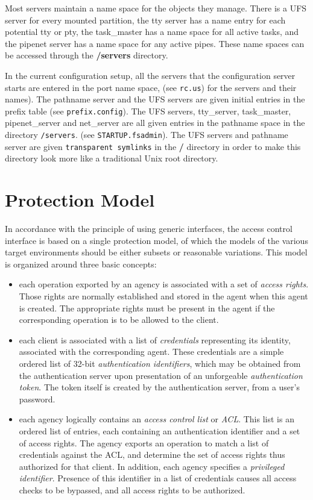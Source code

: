 Most servers maintain a name space for the objects they manage. There is
a UFS server for every mounted partition, the tty server has a name entry
for each potential tty or pty, the task\_master has a name space for all
active tasks, and the pipenet server has a name space for any active pipes.
These name spaces can be accessed through the {\bf /servers} directory.

In the current configuration setup, all the servers that the configuration server
starts are entered in the port name space, (see \verb|rc.us|) for the servers and their
names). The pathname server and the UFS servers
are given initial entries in the prefix table (see \verb|prefix.config|).
The UFS
servers, tty\_server, task\_master, pipenet\_server and net\_server are all
given entries in the pathname space in the directory \verb|/servers|. 
(see \verb|STARTUP.fsadmin|).
The UFS servers and pathname server are given \verb|transparent symlinks|
in the
{\bf /} directory in order to make this directory look more like a traditional
Unix root directory. 

\section{Protection Model} 

In accordance with the principle of using generic interfaces, the
access control interface is based on a single protection model, of
which the models of the various target environments should be either
subsets or reasonable variations. This model is organized around three
basic concepts:
\begin{itemize}
\item each operation exported by an agency is associated with a set of
{\em access rights}. Those rights are normally established and stored
in the agent when this agent is created. The appropriate rights must
be present in the agent if the corresponding operation is to be
allowed to the client.

\item each client is associated with a list of {\em credentials}
representing its identity, associated with the corresponding agent.
These credentials are a simple ordered list of 32-bit {\em
authentication identifiers}, which may be obtained from the
authentication server upon presentation of an unforgeable {\em
authentication token}. The token itself is created by the
authentication server, from a user's password.

\item each agency logically contains an {\em access control list} or
{\em ACL}. This list is an ordered list of entries, each containing an
authentication identifier and a set of access rights. The agency
exports an operation to match a list of credentials against the ACL,
and determine the set of access rights thus authorized for that
client. In addition, each agency specifies a {\em privileged
identifier}. Presence of this identifier in a list of credentials
causes all access checks to be bypassed, and all access rights to be
authorized.
\end{itemize}

